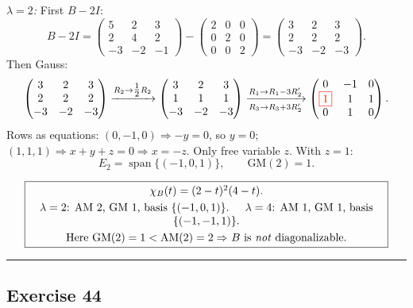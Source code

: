 \documentclass[a4paper,12pt]{article}
\newcommand{\piv}[1]{{\color{red}\boxed{#1}}}
\begin{document}
\textit{$\lambda = 2$:} First $B - 2I$:
\[
B - 2I = \begin{pmatrix} 5 & 2 & 3 \\ 2 & 4 & 2 \\ -3 & -2 & -1 \end{pmatrix} - \begin{pmatrix} 2 & 0 & 0 \\ 0 & 2 & 0 \\ 0 & 0 & 2 \end{pmatrix} = \begin{pmatrix} 3 & 2 & 3 \\ 2 & 2 & 2 \\ -3 & -2 & -3 \end{pmatrix}.
\]
Then Gauss:
\[
\begin{pmatrix} 3 & 2 & 3 \\ 2 & 2 & 2 \\ -3 & -2 & -3 \end{pmatrix}
\xrightarrow{R_2 \to \tfrac12 R_2}
\begin{pmatrix} 3 & 2 & 3 \\ 1 & 1 & 1 \\ -3 & -2 & -3 \end{pmatrix}
\xrightarrow[R_3 \to R_3 + 3R_2']{R_1 \to R_1 - 3R_2'}
\begin{pmatrix} 0 & -1 & 0 \\ \piv{1} & 1 & 1 \\ 0 & 1 & 0 \end{pmatrix}.
\]
Rows as equations: $(0,-1,0) \Rightarrow -y = 0$, so $y = 0$; \; $(1,1,1) \Rightarrow x + y + z = 0 \Rightarrow x = -z$. Only free variable $z$. With $z=1$:
\[
E_2 = \operatorname{span}\{(-1, 0, 1)\}, \qquad \text{GM}(2) = 1.
\]

\[
\fbox{\parbox{0.93\textwidth}{\centering
$\chi_B(t) = (2-t)^2(4-t)$. \\[3pt]
$\lambda = 2$: AM $2$, GM $1$, basis $\{(-1,0,1)\}$. \quad
$\lambda = 4$: AM $1$, GM $1$, basis $\{(-1,-1,1)\}$. \\[3pt]
Here GM$(2) = 1 < {}$AM$(2) = 2 \Rightarrow$ $B$ is \emph{not} diagonalizable.
}}
\]

\bigskip
\hrule
\bigskip

\subsection*{Exercise 44}
\end{document}
